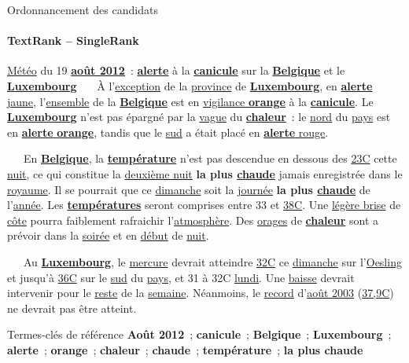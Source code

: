   \begin{frame}{Ordonnancement des candidats}\framesubtitle{TextRank -- SingleRank}
    \begin{exampleblock}{\small
      \underline{Météo} du 19 \underline{\textbf{août 2012}}~:
      \underline{\textbf{alerte}} à la \underline{\textbf{canicule}} sur la
      \underline{\textbf{Belgique}} et le \underline{\textbf{Luxembourg}}
    }\justifying\small
      ~~~À l'\underline{exception} de la \underline{province} de
      \underline{\textbf{Luxembourg}}, en
      \underline{\textbf{alerte} jaune}, l'\underline{ensemble} de
      la \underline{\textbf{Belgique}} est en
      \underline{vigilance \textbf{orange}} à la
      \underline{\textbf{canicule}}. Le \underline{\textbf{Luxembourg}} n'est
      pas épargné par la \underline{vague} du \underline{\textbf{chaleur}}~: le
      \underline{nord} du \underline{pays} est en
      \underline{\textbf{alerte} \textbf{orange}}, tandis que
      le \underline{sud} a était placé en
      \underline{\textbf{alerte} rouge}.

      ~~~En \underline{\textbf{Belgique}}, la \underline{\textbf{température}}
      n'est pas descendue en dessous des \underline{23\degre{}C} cette
      \underline{nuit}, ce qui constitue la \underline{deuxième nuit}
      \textbf{la plus \underline{chaude}} jamais enregistrée dans le
      \underline{royaume}. Il se pourrait que ce \underline{dimanche} soit la
      \underline{journée} \textbf{la plus \underline{chaude}} de l'\underline{année}.
      Les \underline{\textbf{températures}} seront comprises entre 33 et
      \underline{38\degre{}C}. Une \underline{légère brise} de
      \underline{côte} pourra faiblement rafraichir l'\underline{atmosphère}. Des
      \underline{orages} de \underline{\textbf{chaleur}} sont a prévoir dans la
      \underline{soirée} et en \underline{début} de \underline{nuit}.

      ~~~Au \underline{\textbf{Luxembourg}}, le \underline{mercure} devrait
      atteindre \underline{32\degre{}C} ce \underline{dimanche} sur l'\underline{Oesling}
      et jusqu'à \underline{36\degre{}C} sur le \underline{sud} du \underline{pays}, et
      31 à 32\degre{}C \underline{lundi}. Une \underline{baisse} devrait intervenir
      pour le \underline{reste} de la \underline{semaine}. Néanmoins, le
      \underline{record} d'\underline{août 2003} (\underline{37,9\degre{}C}) ne devrait
      pas être atteint.

      \begin{exampleblock}{\small Termes-clés de référence}\justifying\small
        \textbf{Août 2012}~; \textbf{canicule}~;
        \textbf{Belgique}~; \textbf{Luxembourg}~; \textbf{alerte}~;
        \textbf{orange}~; \textbf{chaleur}~; \textbf{chaude}~;
        \textbf{température}~; \textbf{la plus chaude}
      \end{exampleblock}
    \end{exampleblock}
  \end{frame}

